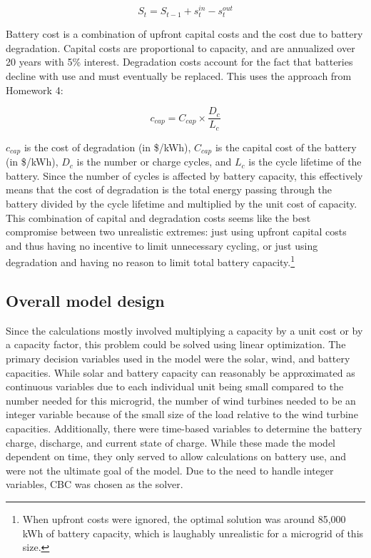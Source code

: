 \documentclass{article}
\begin{document}
\begin{equation}
S_t = S_{t-1} + s^{in}_t - s^{out}_t
\label{eq:battery}
\end{equation}

Battery cost is a combination of upfront capital costs and the cost due to battery degradation.  Capital costs are proportional to capacity, and are annualized over 20 years with 5\% interest.  Degradation costs account for the fact that batteries decline with use and must eventually be replaced.  This uses the approach from Homework 4:

\begin{equation}
c_{\mathit{cap}} = C_{\mathit{cap}} \times \frac{D_c}{L_c}
\label{eq:battery_cost}
\end{equation}

$c_{\mathit{cap}}$ is the cost of degradation (in \$/kWh), $C_{\mathit{cap}}$ is the capital cost of the battery (in \$/kWh), $D_c$ is the number or charge cycles, and $L_c$ is the cycle lifetime of the battery.  Since the number of cycles is affected by battery capacity, this effectively means that the cost of degradation is the total energy passing through the battery divided by the cycle lifetime and multiplied by the unit cost of capacity.  This combination of capital and degradation costs seems like the best compromise between two unrealistic extremes: just using upfront capital costs and thus having no incentive to limit unnecessary cycling, or just using degradation and having no reason to limit total battery capacity.\footnote{When upfront costs were ignored, the optimal solution was around 85,000 kWh of battery capacity, which is laughably unrealistic for a microgrid of this size.}

\subsection{Overall model design}

Since the calculations mostly involved multiplying a capacity by a unit cost or by a capacity factor, this problem could be solved using linear optimization.  The primary decision variables used in the model were the solar, wind, and battery capacities.  While solar and battery capacity can reasonably be approximated as continuous variables due to each individual unit being small compared to the number needed for this microgrid, the number of wind turbines needed to be an integer variable because of the small size of the load relative to the wind turbine capacities.  Additionally, there were time-based variables to determine the battery charge, discharge, and current state of charge.  While these made the model dependent on time, they only served to allow calculations on battery use, and were not the ultimate goal of the model.  Due to the need to handle integer variables, CBC was chosen as the solver.
\end{document}

